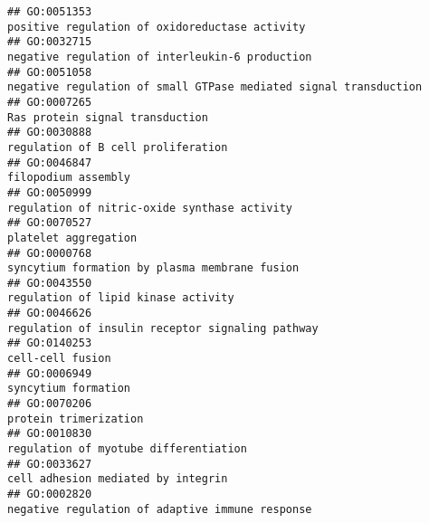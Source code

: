 \documentclass[
]{article}
\begin{document}
\begin{verbatim}
## GO:0051353                                                                                                   positive regulation of oxidoreductase activity
## GO:0032715                                                                                                  negative regulation of interleukin-6 production
## GO:0051058                                                                                 negative regulation of small GTPase mediated signal transduction
## GO:0007265                                                                                                                  Ras protein signal transduction
## GO:0030888                                                                                                               regulation of B cell proliferation
## GO:0046847                                                                                                                              filopodium assembly
## GO:0050999                                                                                                     regulation of nitric-oxide synthase activity
## GO:0070527                                                                                                                             platelet aggregation
## GO:0000768                                                                                                    syncytium formation by plasma membrane fusion
## GO:0043550                                                                                                              regulation of lipid kinase activity
## GO:0046626                                                                                                 regulation of insulin receptor signaling pathway
## GO:0140253                                                                                                                                 cell-cell fusion
## GO:0006949                                                                                                                              syncytium formation
## GO:0070206                                                                                                                            protein trimerization
## GO:0010830                                                                                                            regulation of myotube differentiation
## GO:0033627                                                                                                               cell adhesion mediated by integrin
## GO:0002820                                                                                                  negative regulation of adaptive immune response

\end{verbatim}
\end{document}
